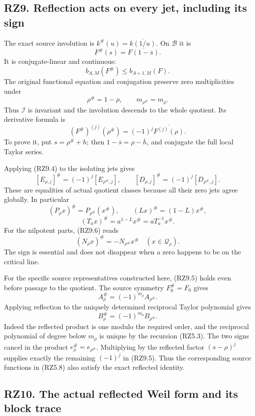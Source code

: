 \documentclass[
]{article}
\begin{document}
\subsection{RZ9. Reflection acts on every jet, including its
sign}\label{rz9.-reflection-acts-on-every-jet-including-its-sign}

The exact source involution is \(k^\#(u)=\overline{k(1/u)}\). On
\(\mathcal B\) it is \[
F^\#(s)=\overline{F(1-\overline s)}.
\tag{RZ9.1}
\] It is conjugate-linear and continuous: \[
b_{A,M}(F^\#)\leq b_{A+1,M}(F).
\tag{RZ9.2}
\] The original functional equation and conjugation preserve zero
multiplicities under \[
\rho^\#=1-\overline\rho,\qquad
m_{\rho^\#}=m_\rho.
\tag{RZ9.3}
\] Thus \(\mathcal I\) is invariant and the involution descends to the
whole quotient. Its derivative formula is \[
(F^\#)^{(j)}(\rho^\#)
=(-1)^j\overline{F^{(j)}(\rho)}.
\tag{RZ9.4}
\] To prove it, put \(s=\rho^\#+h\); then
\(1-\overline s=\rho-\overline h\), and conjugate the full local Taylor
series.

Applying (RZ9.4) to the isolating jets gives \[
[E_{\rho,j}]^\#=(-1)^j[E_{\rho^\#,j}],
\qquad
[D_{\rho,j}]^\#=(-1)^j[D_{\rho^\#,j}].
\tag{RZ9.5}
\] These are equalities of actual quotient classes because all their
zero jets agree globally. In particular \[
(P_\rho x)^\#=P_{\rho^\#}(x^\#),
\qquad
(Lx)^\#=(1-L)x^\#,
\tag{RZ9.6}
\] \[
(T_ax)^\#=a^{1-L}x^\#=aT_a^{-1}x^\#.
\tag{RZ9.7}
\] For the nilpotent parts, (RZ9.6) reads \[
(N_\rho x)^\#=-N_{\rho^\#}x^\#
\quad(x\in\mathcal Q_\rho).
\tag{RZ9.8}
\] The sign is essential and does not disappear when a zero happens to
be on the critical line.

For the specific source representatives constructed here, (RZ9.5) holds
even before passage to the quotient. The source symmetry \(F_0^\#=F_0\)
gives \[
A_\rho^\#=(-1)^{m_\rho}A_{\rho^\#}.
\tag{RZ9.9}
\] Applying reflection to the uniquely determined reciprocal Taylor
polynomial gives \[
B_\rho^\#=(-1)^{m_\rho}B_{\rho^\#}.
\tag{RZ9.10}
\] Indeed the reflected product is one modulo the required order, and
the reciprocal polynomial of degree below \(m_\rho\) is unique by the
recursion (RZ5.3). The two signs cancel in the product
\(e_\rho^\#=e_{\rho^\#}\). Multiplying by the reflected factor
\((s-\rho)^j\) supplies exactly the remaining \((-1)^j\) in (RZ9.5).
Thus the corresponding source functions in (RZ5.8) also satisfy the
exact reflected identity.

\subsection{RZ10. The actual reflected Weil form and its block
trace}\label{rz10.-the-actual-reflected-weil-form-and-its-block-trace}
\end{document}
